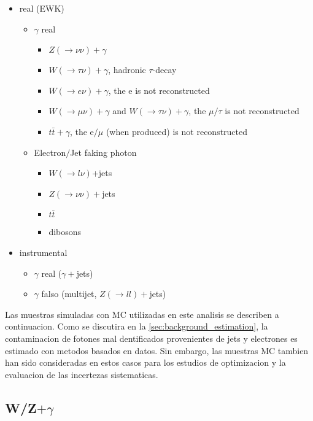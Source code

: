 \begin{itemize}
\item {\MET} real (EWK)
  \begin{itemize}
  \item $\gamma$ real
    \begin{itemize}
    \item $Z(\to\nu\nu)+\gamma$
    \item $W(\to\tau\nu)+\gamma$, hadronic $\tau$-decay
    \item $W(\to e\nu)+\gamma$, the e is not reconstructed
    \item $W(\to\mu\nu)+\gamma$ and $W(\to\tau\nu)+\gamma$, the $\mu / \tau$ is not reconstructed
    \item $t\bar{t}+\gamma$,  the e$/ \mu$ (when produced) is not reconstructed
    \end{itemize}

  \item Electron$/$Jet faking photon
    \begin{itemize}
    \item $W(\to l\nu)$+jets
    \item $Z(\to \nu\nu)+$jets
    \item $t\bar{t}$
    \item dibosons
    \end{itemize}
  \end{itemize}

\item {\MET} instrumental
  \begin{itemize}
  \item $\gamma$ real ($\gamma+$jets)
  \item $\gamma$ falso (multijet, $Z(\to ll)+$jets)
  \end{itemize}
\end{itemize}

Las muestras simuladas con MC utilizadas en este analisis se describen
a continuacion. Como se discutira en la {\Sec} \ref{sec:background_estimation},
la contaminacion de fotones mal dentificados provenientes de jets y electrones
es estimado con metodos basados en datos. Sin embargo, las muestras MC tambien
han sido consideradas en estos casos para los estudios de optimizacion y la
evaluacion de las incertezas sistematicas.

\subsection{W/Z$+\gamma$}

